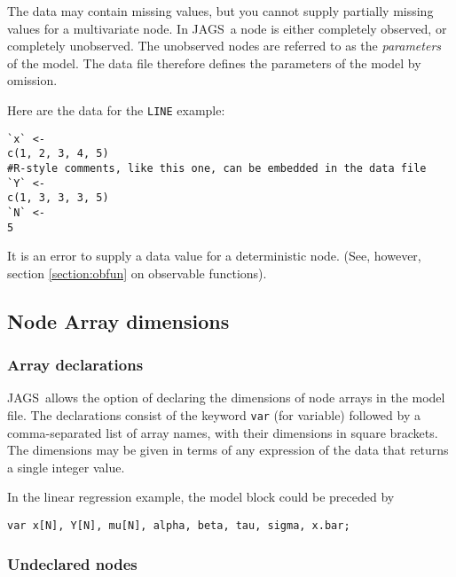 \documentclass[11pt, a4paper, titlepage]{report}
\newcommand{\JAGS}{\textsf{JAGS}}
\begin{document}
The data may contain missing values, but you cannot supply partially
missing values for a multivariate node. In \JAGS\ a node is either
completely observed, or completely unobserved.  The unobserved nodes
are referred to as the {\em parameters} of the model. The data file
therefore defines the parameters of the model by omission.

Here are the data for the \verb+LINE+ example:
\begin{verbatim}
`x` <-
c(1, 2, 3, 4, 5)
#R-style comments, like this one, can be embedded in the data file
`Y` <-
c(1, 3, 3, 3, 5)
`N` <-
5
\end{verbatim}

It is an error to supply a data value for a deterministic node. (See, however,
section \ref{section:obfun} on observable functions).

\subsection{Node Array dimensions}

\subsubsection*{Array declarations}

\JAGS\ allows the option of declaring the dimensions of node arrays in
the model file. The declarations consist of the keyword \texttt{var}
(for variable) followed by a comma-separated list of array names, with
their dimensions in square brackets. The dimensions may be given in
terms of any expression of the data that returns a single integer
value.

In the linear regression example, the model block could be preceded by
\begin{verbatim}
var x[N], Y[N], mu[N], alpha, beta, tau, sigma, x.bar;
\end{verbatim}

\subsubsection*{Undeclared nodes}
\end{document}
